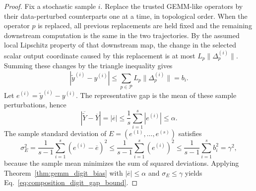 \documentclass[10pt,a4paper]{amsart}
\begin{document}
\begin{proof}
Fix a stochastic sample $i$. Replace the trusted GEMM-like operators by their
data-perturbed counterparts one at a time, in topological order. When the
operator $p$ is replaced, all previous replacements are held fixed and the
remaining downstream computation is the same in the two trajectories. By the
assumed local Lipschitz property of that downstream map, the change in the
selected scalar output coordinate caused by this replacement is at most
$L_p\|\Delta_p^{(i)}\|$. Summing these changes by the triangle inequality gives
\[
|\widetilde{y}^{(i)}-y^{(i)}|
\le
\sum_{p\in\mathcal{P}} L_p\|\Delta_p^{(i)}\|
=b_i.
\]
Let $e^{(i)}=\widetilde{y}^{(i)}-y^{(i)}$. The representative gap is the mean
of these sample perturbations, hence
\[
|\overline{\widetilde{Y}}-\overline{Y}|
=|\overline{e}|
\le \frac{1}{s}\sum_{i=1}^{s}|e^{(i)}|
\le \alpha.
\]
The sample standard deviation of $E=(e^{(1)},\ldots,e^{(s)})$ satisfies
\[
\sigma_E^2
=
\frac{1}{s-1}\sum_{i=1}^{s}(e^{(i)}-\overline{e})^2
\le
\frac{1}{s-1}\sum_{i=1}^{s}(e^{(i)})^2
\le
\frac{1}{s-1}\sum_{i=1}^{s}b_i^2
=\gamma^2,
\]
because the sample mean minimizes the sum of squared deviations. Applying
Theorem~\ref{thm:gemm_digit_bias} with
$|\overline{e}|\le\alpha$ and $\sigma_E\le\gamma$ yields
Eq.~\eqref{eq:composition_digit_gap_bound}.
\end{proof}
\end{document}
